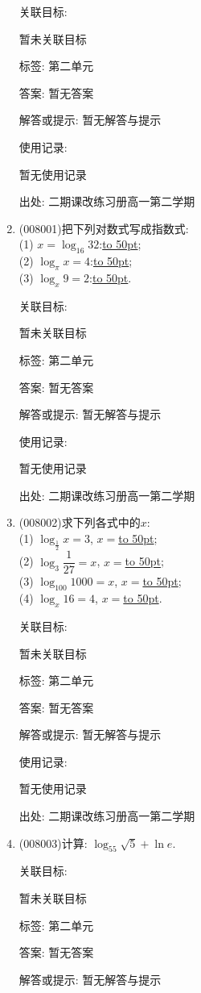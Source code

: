 \documentclass[10pt,a4paper]{article}
\newcommand{\blank}[1]{\underline{\hbox to #1pt{}}}
\begin{document}
\begin{enumerate}[1.]
关联目标:

暂未关联目标



标签: 第二单元

答案: 暂无答案

解答或提示: 暂无解答与提示

使用记录:

暂无使用记录


出处: 二期课改练习册高一第二学期
\item { (008001)}把下列对数式写成指数式:\\
(1) $x=\log _{16}32$:\blank{50};\\
(2) $\log _{\pi }x=4$:\blank{50};\\
(3) $\log _x9=2$:\blank{50}.


关联目标:

暂未关联目标



标签: 第二单元

答案: 暂无答案

解答或提示: 暂无解答与提示

使用记录:

暂无使用记录


出处: 二期课改练习册高一第二学期
\item { (008002)}求下列各式中的$x$:\\
(1) $\log _{\frac 12}x=3$, $x=$\blank{50};\\
(2) $\log _3\dfrac 1{27}=x$, $x=$\blank{50};\\
(3) $\log _{100}1000=x$, $x=$\blank{50};\\
(4) $\log _x16=4$, $x=$\blank{50}.


关联目标:

暂未关联目标



标签: 第二单元

答案: 暂无答案

解答或提示: 暂无解答与提示

使用记录:

暂无使用记录


出处: 二期课改练习册高一第二学期
\item { (008003)}计算: $\log _55\sqrt 5+\ln e$.


关联目标:

暂未关联目标



标签: 第二单元

答案: 暂无答案

解答或提示: 暂无解答与提示


\end{enumerate}
\end{document}
